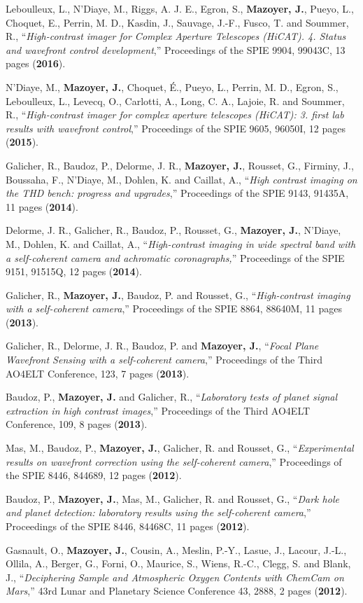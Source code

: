 \documentclass[11pt,a4paper, french]{article}
\begin{document}
\begin{etaremune}
\item Leboulleux, L., N’Diaye, M., Riggs, A. J. E., Egron, S., \textbf{Mazoyer, J.}, Pueyo, L., Choquet, E., Perrin, M. D., Kasdin, J., Sauvage, J.-F., Fusco, T. and Soummer, R., “\textit{High-contrast imager for Complex Aperture Telescopes (HiCAT). 4. Status and wavefront control development},” Proceedings of the SPIE 9904, 99043C, 13 pages (\textbf{2016}).
\item N’Diaye, M., \textbf{Mazoyer, J.}, Choquet, É., Pueyo, L., Perrin, M. D., Egron, S., Leboulleux, L., Levecq, O., Carlotti, A., Long, C. A., Lajoie, R. and Soummer, R., “\textit{High-contrast imager for complex aperture telescopes (HiCAT): 3. first lab results with wavefront control},” Proceedings of the SPIE 9605, 96050I, 12 pages (\textbf{2015}).
\item Galicher, R., Baudoz, P., Delorme, J. R., \textbf{Mazoyer, J.}, Rousset, G., Firminy, J., Boussaha, F., N’Diaye, M., Dohlen, K. and Caillat, A., “\textit{High contrast imaging on the THD bench: progress and upgrades},” Proceedings of the SPIE 9143, 91435A, 11 pages (\textbf{2014}).
\item Delorme, J. R., Galicher, R., Baudoz, P., Rousset, G., \textbf{Mazoyer, J.}, N’Diaye, M., Dohlen, K. and Caillat, A., “\textit{High-contrast imaging in wide spectral band with a self-coherent camera and achromatic coronagraphs,}” Proceedings of the SPIE 9151, 91515Q, 12 pages (\textbf{2014}).
\item Galicher, R., \textbf{Mazoyer, J.}, Baudoz, P. and Rousset, G., “\textit{High-contrast imaging with a self-coherent camera},” Proceedings of the SPIE 8864, 88640M, 11 pages (\textbf{2013}).
\item \item Galicher, R., Delorme, J. R., Baudoz, P. and \textbf{Mazoyer, J.}, “\textit{Focal Plane Wavefront Sensing with a self-coherent camera},” Proceedings of the Third AO4ELT Conference, 123, 7 pages (\textbf{2013}).
\item Baudoz, P., \textbf{Mazoyer, J.} and Galicher, R., “\textit{Laboratory tests of planet signal extraction in high contrast images},” Proceedings of the Third AO4ELT Conference, 109, 8 pages (\textbf{2013}).
\item Mas, M., Baudoz, P., \textbf{Mazoyer, J.}, Galicher, R. and Rousset, G., “\textit{Experimental results on wavefront correction using the self-coherent camera},” Proceedings of the SPIE 8446, 844689, 12 pages (\textbf{2012}).
\item Baudoz, P., \textbf{Mazoyer, J.}, Mas, M., Galicher, R. and Rousset, G., “\textit{Dark hole and planet detection: laboratory results using the self-coherent camera},” Proceedings of the SPIE 8446, 84468C, 11 pages (\textbf{2012}).
\item \item Gasnault, O., \textbf{Mazoyer, J.}, Cousin, A., Meslin, P.-Y., Lasue, J., Lacour, J.-L., Ollila, A., Berger, G., Forni, O., Maurice, S., Wiens, R.-C., Clegg, S. and Blank, J., “\textit{Deciphering Sample and Atmospheric Oxygen Contents with ChemCam on Mars},” 43rd Lunar and Planetary Science Conference 43, 2888, 2 pages (\textbf{2012}).
\end{etaremune}
\end{document}
